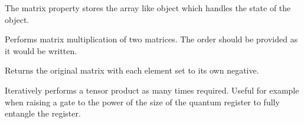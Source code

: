 \documentclass[letterpaper,10pt,english]{sphinxmanual}
\begin{document}
\begin{fulllineitems}
\begin{fulllineitems}
\label{\detokenize{index:utils.sparseMatrix.sparseMatrix.matrix}}
\pysigstartsignatures
{}
\pysigstopsignatures
\sphinxAtStartPar
The matrix property stores the array like object which handles the state
of the object.

\end{fulllineitems}


\begin{fulllineitems}
\label{\detokenize{index:utils.sparseMatrix.sparseMatrix.multiply}}
\pysigstartsignatures
{}
\pysigstopsignatures
\sphinxAtStartPar
Performs matrix multiplication of two matrices. The order should be provided as it would
be written.

\end{fulllineitems}


\begin{fulllineitems}
\label{\detokenize{index:utils.sparseMatrix.sparseMatrix.negate}}
\pysigstartsignatures
{}
\pysigstopsignatures
\sphinxAtStartPar
Returns the original matrix with each element set to its own negative.

\end{fulllineitems}


\begin{fulllineitems}
\label{\detokenize{index:utils.sparseMatrix.sparseMatrix.power}}
\pysigstartsignatures
{}
\pysigstopsignatures
\sphinxAtStartPar
Iteratively performs a tensor product as many times required. Useful for example when raising a
gate to the power of the size of the quantum register to fully entangle the register.


\end{fulllineitems}
\end{fulllineitems}
\end{document}
